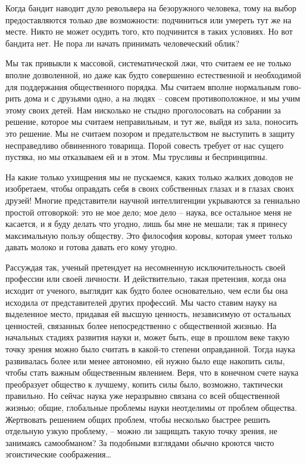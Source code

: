 \documentclass{book}
\begin{document}
Когда бандит наводит дуло револьвера на безоружного че­ловека, тому на выбор предоставляются только две возмож­ности: подчиниться или умереть тут же на месте. Никто не может осудить того, кто подчинится в таких условиях. Но вот бандита нет. Не пора ли начать принимать человеческий облик?

Мы так привыкли к массовой, систематической лжи, что считаем ее не только вполне дозволенной, но даже как будто совершенно естественной и необходимой для поддержания общественного порядка. Мы считаем вполне нормальным гово­рить дома и с друзьями одно, а на людях -- совсем противопо­ложное, и мы учим этому своих детей. Нам нисколько не стыд­но проголосовать на собрании за решение, которое мы счита­ем неправильным, и тут же, выйдя из зала, поносить это реше­ние. Мы не считаем позором и предательством не выступить в защиту несправедливо обвиненного товарища. Порой совесть требует от нас сущего пустяка, но мы отказываем ей и в этом. Мы трусливы и беспринципны.

На какие только ухищрения мы не пускаемся, каких только жалких доводов не изобретаем, чтобы оправдать себя в своих собственных глазах и в глазах своих друзей! Многие представители научной интеллигенции укрываются за гениально простой отговоркой: это не мое дело; мое дело -- наука, все остальное меня не касается, и я буду делать что угодно, лишь бы мне не мешали; так я принесу максималь­ную пользу обществу. Это философия коровы, которая умеет только давать молоко и готова давать его кому угодно.

Рассуждая так, ученый претендует на несомненную исключительность своей профессии или своей личности. И действительно, такая 
претензия, когда она исходит от ученого, вы­глядит как будто более основательно, чем если бы она исхо­дила от представителей 
других профессий. Мы часто ставим науку на выделенное место, придавая ей высшую ценность, независимую от остальных ценностей, 
связанных более непо­средственно с общественной жизнью. На начальных стадиях развития науки и, может быть, еще в прошлом веке 
такую точку зрения можно было считать в какой-то степени оправ­данной. Тогда наука развивалась более или менее автономно, ей 
нужно было еще накопить силы, чтобы стать важным общест­венным явлением. Веря, что в конечном счете наука преобра­зует общество к 
лучшему, копить силы было, возможно, такти­чески правильно. Но сейчас наука уже неразрывно связана со всей общественной жизнью; 
общие, глобальные проблемы науки неотделимы от проблем общества. Жертвовать решением общих проблем, чтобы несколько быстрее 
решить отдельную узкую проблему, -- можно ли защищать такую точку зрения, не занимаясь самообманом? За подобными взглядами 
обычно кроются чисто эгоистические соображения\ldots
\end{document}
